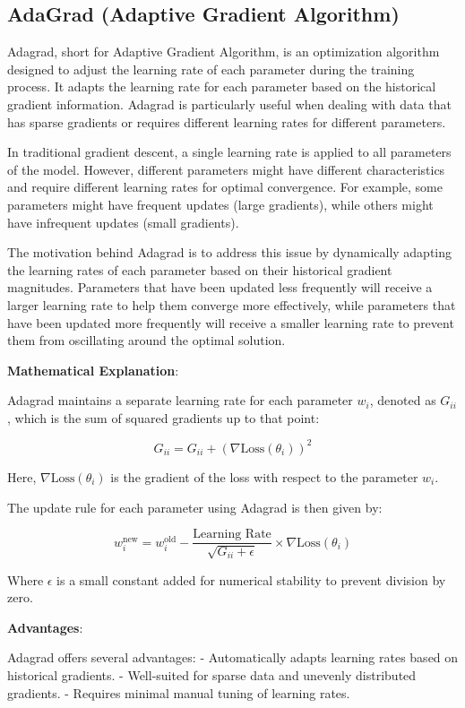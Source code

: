 \documentclass{report}
\begin{document}
\subsection{AdaGrad (Adaptive Gradient Algorithm)}
Adagrad, short for Adaptive Gradient Algorithm, is an optimization algorithm designed to adjust the learning rate of each parameter during the training process. It adapts the learning rate for each parameter based on the historical gradient information. Adagrad is particularly useful when dealing with data that has sparse gradients or requires different learning rates for different parameters.

In traditional gradient descent, a single learning rate is applied to all parameters of the model. However, different parameters might have different characteristics and require different learning rates for optimal convergence. For example, some parameters might have frequent updates (large gradients), while others might have infrequent updates (small gradients).

The motivation behind Adagrad is to address this issue by dynamically adapting the learning rates of each parameter based on their historical gradient magnitudes. Parameters that have been updated less frequently will receive a larger learning rate to help them converge more effectively, while parameters that have been updated more frequently will receive a smaller learning rate to prevent them from oscillating around the optimal solution.

\textbf{Mathematical Explanation}:

Adagrad maintains a separate learning rate for each parameter \(w_i\), denoted as \(G_{ii}\), which is the sum of squared gradients up to that point:

\[ G_{ii} = G_{ii} + (\nabla \text{Loss}(\theta_i))^2 \]

Here, \(\nabla \text{Loss}(\theta_i)\) is the gradient of the loss with respect to the parameter \(w_i\).

The update rule for each parameter using Adagrad is then given by:

\[ w_i^\text{new} = w_i^\text{old} - \frac{\text{Learning Rate}}{\sqrt{G_{ii} + \epsilon}} \times \nabla \text{Loss}(\theta_i) \]

Where \(\epsilon\) is a small constant added for numerical stability to prevent division by zero.

\textbf{Advantages}:

Adagrad offers several advantages:
- Automatically adapts learning rates based on historical gradients.
- Well-suited for sparse data and unevenly distributed gradients.
- Requires minimal manual tuning of learning rates.
\end{document}
